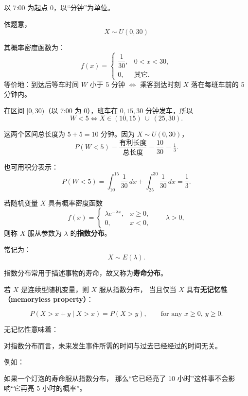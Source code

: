 \begin{solution}
以 7:00 为起点 $0$，以“分钟”为单位。

依题意， 
\[
X \sim U(0,30)
\]

其概率密度函数为：
\[
f(x)=
\begin{cases}
\dfrac{1}{30}, & 0<x<30,\\[6pt]
0, & \text{其它}.
\end{cases}
\]
等价地：到达后等车时间 $W$ 小于 5 分钟 
$\iff$ 乘客到达时刻 $X$ 落在每班车前的 5 分钟内。

在区间 $[0,30)$（以 7:00 为 0），班车在 $0,15,30$ 分钟发车，所以
\[
W < 5 \iff X \in (10,15)\ \cup\ (25,30).
\]

这两个区间总长度为 $5 + 5 = 10$ 分钟。因为 $X \sim U(0,30)$，
\[
P(W<5)
= \frac{\text{有利长度}}{\text{总长度}}
= \frac{10}{30}
= \boxed{\tfrac{1}{3}}.
\]

也可用积分表示：
\[
P(W<5)
= \int_{10}^{15}\frac{1}{30}\,dx
+ \int_{25}^{30}\frac{1}{30}\,dx
= \frac{1}{3}.
\]
\end{solution}
\begin{definition}[指数分布]
若随机变量 $X$ 具有概率密度函数
\[
f(x) =
\begin{cases}
\lambda e^{-\lambda x}, & x \ge 0, \\[6pt]
0, & x < 0,
\end{cases}
\qquad \lambda > 0,
\]
则称 $X$ 服从参数为 $\lambda$ 的\textbf{指数分布}。

常记为：
\[
X \sim E(\lambda).
\]

指数分布常用于描述事物的寿命，故又称为\textbf{寿命分布}。
\end{definition}
\begin{theorem}[指数分布的无记忆性]
若 $X$ 是连续型随机变量，则 $X$ 服从指数分布，
当且仅当 $X$ 具有\textbf{无记忆性（memoryless property）}：

\[
P(X > x + y \mid X > x) = P(X > y), 
\qquad \text{for any } x \ge 0,\ y \ge 0.
\]
\end{theorem}
\begin{remark}
    无记忆性意味着：

对指数分布而言，未来发生事件所需的时间与过去已经经过的时间无关。

例如：

如果一个灯泡的寿命服从指数分布，
那么“它已经亮了 10 小时”这件事不会影响“它再亮 5 小时的概率”。
\end{remark}

